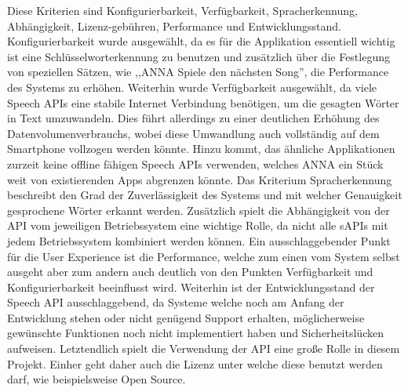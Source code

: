 Diese Kriterien sind Konfigurierbarkeit, Verfügbarkeit, Spracherkennung, Abhängigkeit, Lizenz-gebühren, Performance und Entwicklungsstand. Konfigurierbarkeit wurde ausgewählt, da es für die Applikation essentiell wichtig ist eine Schlüsselworterkennung zu benutzen und zusätzlich über die Festlegung von speziellen Sätzen, wie ,,ANNA Spiele den nächsten Song'', die Performance des Systems zu erhöhen. Weiterhin wurde Verfügbarkeit ausgewählt, da viele Speech \ac{API}s eine stabile Internet Verbindung benötigen, um die gesagten Wörter in Text umzuwandeln. Dies führt allerdings zu einer deutlichen Erhöhung des Datenvolumenverbrauchs, wobei diese Umwandlung auch vollständig auf dem Smartphone vollzogen werden könnte. Hinzu kommt, das ähnliche Applikationen zurzeit keine offline fähigen Speech \ac{API}s verwenden, welches ANNA ein Stück weit von existierenden Apps abgrenzen könnte. Das Kriterium Spracherkennung beschreibt den Grad der Zuverlässigkeit des Systems und mit welcher Genauigkeit gesprochene Wörter erkannt werden. Zusätzlich spielt die Abhängigkeit von der \ac{API} vom jeweiligen Betriebssystem eine wichtige Rolle, da nicht alle s\ac{API}s mit jedem Betriebssystem kombiniert werden können. Ein ausschlaggebender Punkt für die User Experience ist die Performance, welche zum einen vom System selbst ausgeht aber zum andern auch deutlich von den Punkten Verfügbarkeit und Konfigurierbarkeit beeinflusst wird. Weiterhin ist der Entwicklungsstand der Speech \ac{API} ausschlaggebend, da Systeme welche noch am Anfang der Entwicklung stehen oder nicht genügend Support erhalten, möglicherweise gewünschte Funktionen noch nicht implementiert haben und Sicherheitslücken aufweisen. Letztendlich spielt die Verwendung der \ac{API} eine große Rolle in diesem Projekt. Einher geht daher auch die Lizenz unter welche diese benutzt werden darf, wie beispielsweise Open Source. 

